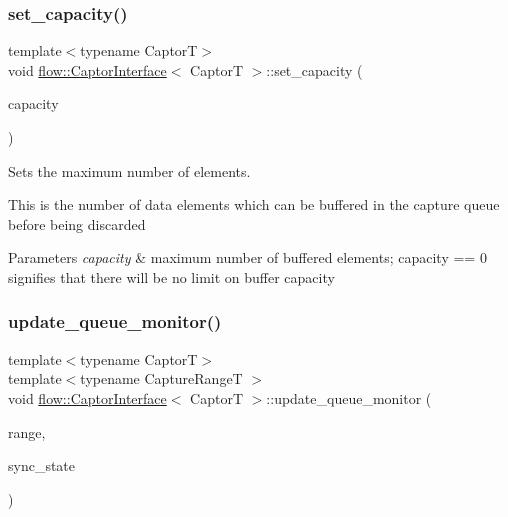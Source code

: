 \subsubsection{\texorpdfstring{set\+\_\+capacity()}{set\_capacity()}}
{\footnotesize\ttfamily template$<$typename CaptorT$>$ \\
void \hyperlink{classflow_1_1_captor_interface}{flow\+::\+Captor\+Interface}$<$ CaptorT $>$\+::set\+\_\+capacity (\begin{DoxyParamCaption}\item[{const \hyperlink{classflow_1_1_captor_interface_a62db6a158eebcb377e63ede6a1f1a8c6}{size\+\_\+type}}]{capacity }\end{DoxyParamCaption})\hspace{0.3cm}{\ttfamily [inline]}}



Sets the maximum number of elements. 

This is the number of data elements which can be buffered in the capture queue before being discarded


\begin{DoxyParams}{Parameters}
{\em capacity} & maximum number of buffered elements; {\ttfamily capacity == 0} signifies that there will be no limit on buffer capacity \\
\hline
\end{DoxyParams}
\mbox{\label{classflow_1_1_captor_interface_aed9ad6819bfbcdda915febb57274842e}} 
\subsubsection{\texorpdfstring{update\+\_\+queue\+\_\+monitor()}{update\_queue\_monitor()}}
{\footnotesize\ttfamily template$<$typename CaptorT$>$ \\
template$<$typename Capture\+RangeT $>$ \\
void \hyperlink{classflow_1_1_captor_interface}{flow\+::\+Captor\+Interface}$<$ CaptorT $>$\+::update\+\_\+queue\+\_\+monitor (\begin{DoxyParamCaption}\item[{Capture\+RangeT \&\&}]{range,  }\item[{const \hyperlink{namespaceflow_adefe9726e597eb50c46f0f6a202018e9}{State}}]{sync\+\_\+state }\end{DoxyParamCaption})\hspace{0.3cm}{\ttfamily [inline]}}



